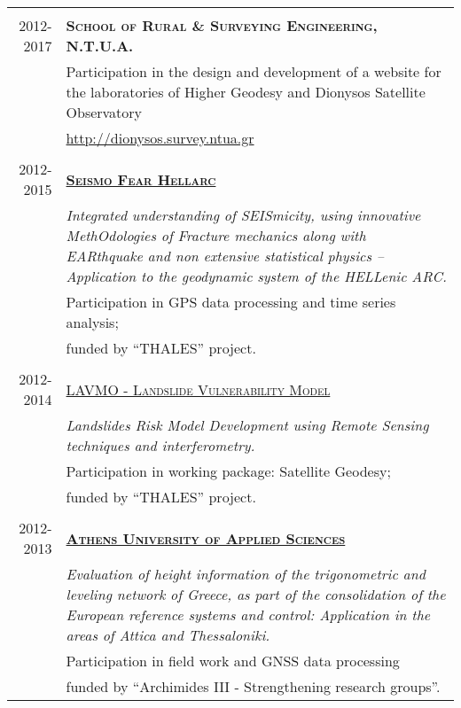 \documentclass[9pt]{extarticle} %
\begin{document}
\begin{longtable}{r|p{13cm}}
%
\multicolumn{2}{c}{} \\
\textsc{2012-2017} & \textbf{\textsc{School of Rural \& Surveying Engineering, N.T.U.A.}}\\
  & Participation in the design and development of a website for the laboratories of Higher Geodesy and Dionysos Satellite Observatory\\
  & \url{http://dionysos.survey.ntua.gr}\\
%
\multicolumn{2}{c}{} \\
\textsc{2012-2015} & \textbf{\textsc{\href{http://excellence.minedu.gov.gr/thales/en/thalesprojects/380208}{Seismo Fear Hellarc}}}\\
  & \textit{Integrated understanding of SEISmicity, using innovative MethOdologies of Fracture mechanics along with EARthquake and non extensive statistical physics – Application to the geodynamic system of the HELLenic ARC.}\\
  & Participation in GPS data processing and time series analysis;\\
  & funded by \textquotedblleft THALES\textquotedblright{} project.\\
%
\multicolumn{2}{c}{} \\ 
\textsc{2012-2014} & \textsc{\href{http://excellence.minedu.gov.gr/thales/en/thalesprojects/379347}{LAVMO - Landslide Vulnerability Model}}\\
  & \textit{Landslides Risk Model Development using Remote Sensing techniques and interferometry.}\\
  & Participation in working package: Satellite Geodesy;\\
  & funded by \textquotedblleft THALES\textquotedblright{} project.\\
%
\multicolumn{2}{c}{} \\
\textsc{2012-2013} & \textbf{\textsc{\href{http://www.teiath.gr/?lang=en}{Athens University of Applied Sciences}}}\\
  & \textit{Evaluation of height information of the trigonometric and leveling network of Greece, as part of the consolidation of the European reference systems and control: Application in the areas of Attica and Thessaloniki.}\\
  & Participation in field work and GNSS data processing \\
  & funded by \textquotedblleft Archimides III - Strengthening research groups\textquotedblright{}.\\

\end{longtable}
\end{document}
